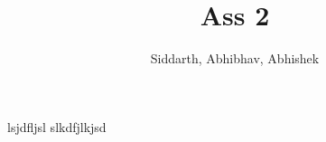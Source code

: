 \documentclass{article}
\title{Ass 2}
\author{Siddarth, Abhibhav, Abhishek}
\begin{document}
\maketitle
lsjdfljsl
slkdfjlkjsd
\end{document}
